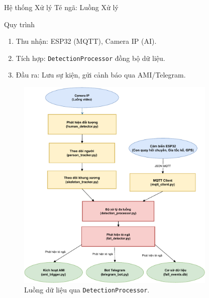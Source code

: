 \begin{frame}[fragile]{Hệ thống Xử lý Té ngã: Luồng Xử lý}
    \begin{block}{Quy trình}
        \begin{enumerate}
            \item Thu nhận: ESP32 (MQTT), Camera IP (AI).
            \item Tích hợp: \texttt{DetectionProcessor} đồng bộ dữ liệu.
            \item Đầu ra: Lưu sự kiện, gửi cảnh báo qua AMI/Telegram.
        \end{enumerate}
    \end{block}
    \begin{figure}
        \centering
        \includegraphics[width=0.85\textwidth,height=0.5\textheight,keepaspectratio]{images/server_flow.pdf}
        \caption{Luồng dữ liệu qua \texttt{DetectionProcessor}.}
        \label{fig:server_flow}
    \end{figure}
\end{frame}

